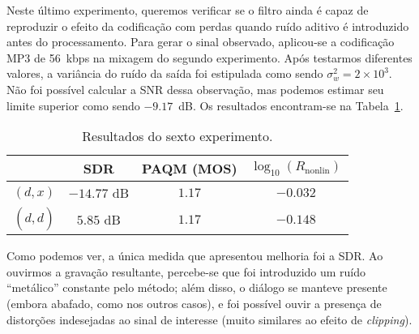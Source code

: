 Neste último experimento, queremos verificar se o filtro ainda é capaz de reproduzir o efeito da codificação com perdas quando ruído aditivo é introduzido antes do processamento. Para gerar o sinal observado, aplicou-se a codificação MP3 de 56~kbps na mixagem do segundo experimento. Após testarmos diferentes valores, a variância do ruído da saída foi estipulada como sendo $\sigma_w^2 = 2 \times 10^{3}$. Não foi possível calcular a SNR dessa observação, mas podemos estimar seu limite superior como sendo $-9.17$~dB. Os resultados encontram-se na Tabela~\ref{tab:unscented:experiment-6}.
{\def\arraystretch{1.25}\tabcolsep=10pt
\begin{table}[!ht]
    \centering
    \caption[Resultados do sexto experimento: \textit{fades} com ruído aditivo e codificação com perdas]{Resultados do sexto experimento.}
    \label{tab:unscented:experiment-6}
    \begin{tabular}{cccc}
        \toprule
                         & SDR        & PAQM (MOS)   & $\log_{10}(R_{\text{nonlin}})$ \\
        \midrule
        $(d, x)$       & $-14.77$ dB & $1.17$  &  $-0.032$               \\
        $(d, \hat{d})$ & $5.85$ dB & $1.17$  &   $-0.148$              \\ \bottomrule
    \end{tabular}
\end{table}
}

Como podemos ver, a única medida que apresentou melhoria foi a SDR. Ao ouvirmos a gravação resultante, percebe-se que foi introduzido um ruído ``metálico'' constante pelo método; além disso, o diálogo se manteve presente (embora abafado, como nos outros casos), e foi possível ouvir a presença de distorções indesejadas ao sinal de interesse (muito similares ao efeito de \textit{clipping}).